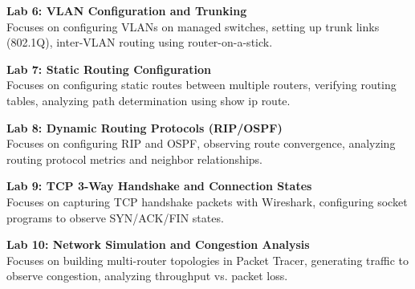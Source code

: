 \noindent\textbf{Lab 6: VLAN Configuration and Trunking} \\
Focuses on configuring VLANs on managed switches, setting up trunk links (802.1Q), inter-VLAN routing using router-on-a-stick.

\vspace{0.2cm}

\noindent\textbf{Lab 7: Static Routing Configuration} \\
Focuses on configuring static routes between multiple routers, verifying routing tables, analyzing path determination using show ip route.

\vspace{0.2cm}

\noindent\textbf{Lab 8: Dynamic Routing Protocols (RIP/OSPF)} \\
Focuses on configuring RIP and OSPF, observing route convergence, analyzing routing protocol metrics and neighbor relationships.

\vspace{0.2cm}

\noindent\textbf{Lab 9: TCP 3-Way Handshake and Connection States} \\
Focuses on capturing TCP handshake packets with Wireshark, configuring socket programs to observe SYN/ACK/FIN states.

\vspace{0.2cm}

\noindent\textbf{Lab 10: Network Simulation and Congestion Analysis} \\
Focuses on building multi-router topologies in Packet Tracer, generating traffic to observe congestion, analyzing throughput vs. packet loss.

\vspace{0.2cm}

\newpage
{}
